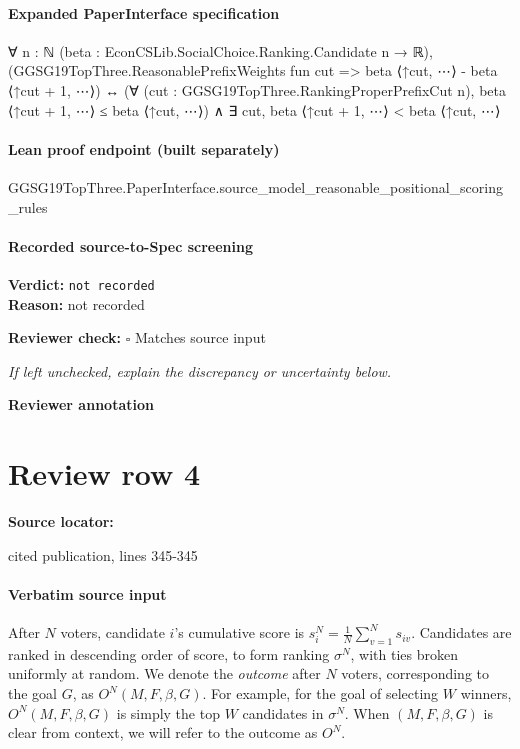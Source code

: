 \documentclass[10pt]{article}
\newcommand{\reviewerbox}{%
  \par\noindent\fbox{\parbox{0.96\linewidth}{\rule{0pt}{0.38in}}}\par
}
\newcommand{\reviewmatch}[1]{%
  \par\noindent\textbf{Reviewer check:} $\square$\; #1\par
  \noindent\emph{If left unchecked, explain the discrepancy or uncertainty below.}\par
}
\begin{document}
\paragraph{Expanded PaperInterface specification}
\begin{ReviewVerbatim}
∀ {n : ℕ} (beta : EconCSLib.SocialChoice.Ranking.Candidate n → ℝ),
  (GGSG19TopThree.ReasonablePrefixWeights fun cut => beta ⟨↑cut, ⋯⟩ - beta ⟨↑cut + 1, ⋯⟩) ↔
    (∀ (cut : GGSG19TopThree.RankingProperPrefixCut n), beta ⟨↑cut + 1, ⋯⟩ ≤ beta ⟨↑cut, ⋯⟩) ∧
      ∃ cut, beta ⟨↑cut + 1, ⋯⟩ < beta ⟨↑cut, ⋯⟩
\end{ReviewVerbatim}

\paragraph{Lean proof endpoint (built separately)}\begin{ReviewVerbatim}
GGSG19TopThree.PaperInterface.source_model_reasonable_positional_scoring_rules
\end{ReviewVerbatim}

\paragraph{Recorded source-to-Spec screening}
\textbf{Verdict:} \texttt{not recorded}
\\
\textbf{Reason:} not recorded
\reviewmatch{Matches source input}
\noindent\textbf{Reviewer annotation}\par
\reviewerbox
\clearpage
\hypertarget{source-claim-3a12b78d8616e04f}{}
\section*{Review row 4}
\textbf{Source locator:} {\footnotesize\raggedright cited publication, lines 345-\allowbreak{}345\par}
\paragraph{Verbatim source input}
\begin{ReviewVerbatim}
 After $N$ voters, candidate $i$'s cumulative score is $s_i^N = \frac{1}{N} \sum_{v=1}^N s_{iv}$. Candidates are ranked in descending order of score, to form ranking ${\sigma}^N$, with ties broken uniformly at random. We denote the \textit{outcome} after $N$ voters, corresponding to the goal $G$, as $O^N(M, F, \beta, G)$. For example, for the goal of selecting $W$ winners, $O^N(M, F, \beta, G)$ is simply the top $W$ candidates in ${\sigma}^N$. When $(M, F, \beta, G)$ is clear from context, we will refer to the outcome as $O^N$.
\end{ReviewVerbatim}
\end{document}
